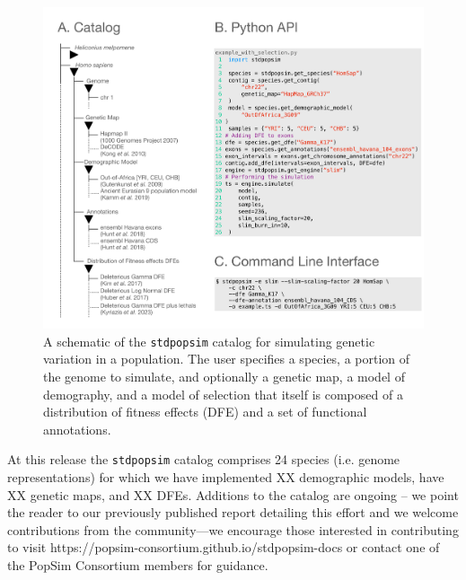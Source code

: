 \documentclass[hidelinks]{article}
\newcommand{\stdpopsim}{\texttt{stdpopsim}\xspace}
\begin{document}
    \begin{figure}
        \vspace{-0.0cm}
        \includegraphics[width=\linewidth]{figures/schematics/catalog.pdf}
        \caption{\label{fig:schematic}
        A schematic of the \stdpopsim catalog for simulating genetic variation
        in a population. The user specifies a species, a portion of the genome to simulate,
        and optionally a genetic map, a model of demography, and a model of selection that 
        itself is composed of a distribution of fitness effects (DFE) and a set of functional
        annotations.}
    \end{figure}
    \hfill

    At this release the \stdpopsim catalog comprises 24 species (i.e. genome representations)
    for which we have implemented XX demographic models, have XX genetic maps, and XX DFEs.
    Additions to the catalog are ongoing -- we point the reader to our previously published 
    report detailing this effort \citep{lauterbur2023expanding} and we welcome contributions from the
    community---we encourage those interested in contributing to visit https://popsim-consortium.github.io/stdpopsim-docs
    or contact one of the PopSim Consortium members for guidance.
\end{document}
